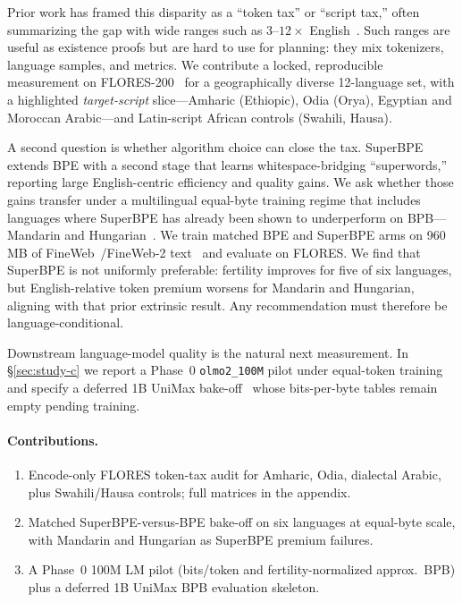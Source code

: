 \documentclass[11pt,a4paper]{article}
\begin{document}
Prior work has framed this disparity as a ``token tax'' or ``script tax,'' often summarizing the gap with wide ranges such as $3$--$12\times$ English~\citep{dixit2026scripttax,somide2026african,petrov2023unfairness}.
Such ranges are useful as existence proofs but are hard to use for planning: they mix tokenizers, language samples, and metrics.
We contribute a locked, reproducible measurement on FLORES-200~\citep{goyal2022flores,nllb2022} for a geographically diverse 12-language set, with a highlighted \emph{target-script} slice---Amharic (Ethiopic), Odia (Orya), Egyptian and Moroccan Arabic---and Latin-script African controls (Swahili, Hausa).

A second question is whether algorithm choice can close the tax.
SuperBPE~\citep{liu2025superbpe} extends BPE with a second stage that learns whitespace-bridging ``superwords,'' reporting large English-centric efficiency and quality gains.
We ask whether those gains transfer under a multilingual equal-byte training regime that includes languages where SuperBPE has already been shown to underperform on BPB---Mandarin and Hungarian~\citep{chowdhury-woolf-2026-benchmarking}.
We train matched BPE and SuperBPE arms on 960\,MB of FineWeb~/FineWeb-2 text~\citep{penedo2024fineweb,penedo2025fineweb2} and evaluate on FLORES.
We find that SuperBPE is not uniformly preferable: fertility improves for five of six languages, but English-relative token premium worsens for Mandarin and Hungarian, aligning with that prior extrinsic result.
Any recommendation must therefore be language-conditional.

Downstream language-model quality is the natural next measurement.
In \S\ref{sec:study-c} we report a Phase~0 \texttt{olmo2\_100M} pilot under equal-token training and specify a deferred 1B UniMax bake-off~\citep{chung2023unimax} whose bits-per-byte tables remain empty pending training.

\paragraph{Contributions.}
\begin{enumerate}[leftmargin=*,itemsep=2pt]
  \item Encode-only FLORES token-tax audit for Amharic, Odia, dialectal Arabic, plus Swahili/Hausa controls; full matrices in the appendix.
  \item Matched SuperBPE-versus-BPE bake-off on six languages at equal-byte scale, with Mandarin and Hungarian as SuperBPE premium failures.
  \item A Phase~0 100M LM pilot (bits/token and fertility-normalized approx.\ BPB) plus a deferred 1B UniMax BPB evaluation skeleton.
\end{enumerate}
\end{document}
